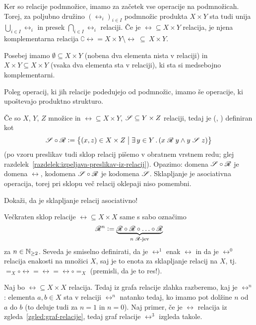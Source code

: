                 Ker so relacije podmnožice, imamo za začetek vse operacije na podmnožicah. Torej, za poljubno družino $(\rel_i)_{i \in I}$ podmnožic produkta $X \times Y$ sta tudi unija $\bigcup_{i \in I} \rel_i$ in presek $\bigcap_{i \in I} \rel_i$ relaciji. Če je $\rel \subseteq X \times Y$ relacija, je njena komplementarna relacija $\complement{\rel} = X \times Y \setminus \rel \ \subseteq \ X \times Y$.

                Posebej imamo  $\emptyset \subseteq X \times Y$ (nobena dva elementa nista v relaciji) in  $X \times Y \subseteq X \times Y$ (vsaka dva elementa sta v relaciji), ki sta si medsebojno komplementarni.

                Poleg operacij, ki jih relacije podedujejo od podmnožic, imamo še operacije, ki upoštevajo produktno strukturo.

                Če so $X$, $Y$, $Z$ množice in $\rel \subseteq X \times Y$, $\srel \subseteq Y \times Z$ relaciji, tedaj je  (, )  definiran kot
                \[\srel \circ \rel \dfeq \set[1]{(x, z) \in X \times Z}{\some{y}[Y]{\rel[x][y] \land \srel[y][z]}}\]
                (po vzoru preslikav tudi sklop relacij pišemo v obratnem vrstnem redu; glej razdelek~\ref{razdelek:izpeljava-preslikav-iz-relacij}). Opazimo: domena $\srel \circ \rel$ je domena $\rel$, kodomena $\srel \circ \rel$ je kodomena $\srel$. Sklapljanje je asociativna operacija, torej pri sklopu več relacij oklepaji niso pomembni.

                \begin{vaja}
                        Dokaži, da je sklapljanje relacij asociativno!
                \end{vaja}

                Večkraten sklop relacije $\rel \subseteq X \times X$ same s sabo označimo
                \[\rel^n \dfeq \underbrace{\rel \circ \rel \circ \ldots \circ \rel}_{\text{$n$ $\rel$-jev}}\]
                za $n \in \mathbb{N}_{\geq 2}$. Seveda je smiselno definirati, da je $\rel^1$ enak $\rel$ in da je $\rel^0$ relacija enakosti na množici $X$, saj je to enota za sklapljanje relacij na $X$, tj.~$=_X \circ \rel = \rel = \rel \circ =_X$ (premisli, da je to res!).

                \begin{zgled}
                        Naj bo $\rel \subseteq X \times X$ relacija. Tedaj iz grafa relacije zlahka razberemo, kaj je $\rel^n$: elementa $a, b \in X$ sta v relaciji $\rel^n$ natanko tedaj, ko imamo pot dolžine $n$ od $a$ do $b$ (to deluje tudi za $n = 1$ in $n = 0$). Naj primer, če je $\rel$ relacija iz zgleda~\ref{zgled:graf-relacije}, tedaj graf relacije $\rel^3$ izgleda takole.

                \end{zgled}

